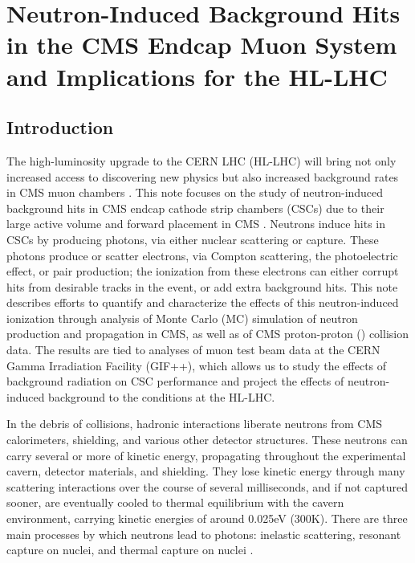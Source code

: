 \chapter{Neutron-Induced Background Hits in the CMS Endcap Muon System and Implications for the HL-LHC}
\section{Introduction}
\label{sec:intro}
The high-luminosity upgrade to the CERN LHC (HL-LHC) will bring not only increased access to discovering new physics but also increased background rates in CMS muon chambers \cite{Evans:2008zzb,Apollinari:2116337}. This note focuses on the study of neutron-induced background hits in CMS endcap cathode strip chambers (CSCs) due to their large active volume and forward placement in CMS \cite{CMS:1997dma,Chatrchyan:2009hb}. Neutrons induce hits in CSCs by producing photons, via either nuclear scattering or capture. These photons produce or scatter electrons, via Compton scattering, the photoelectric effect, or pair production; the ionization from these electrons can either corrupt hits from desirable tracks in the event, or add extra background hits. This note describes efforts to quantify and characterize the effects of this neutron-induced ionization through analysis of Monte Carlo (MC) simulation of neutron production and propagation in CMS, as well as of CMS proton-proton (\pp) collision data. The results are tied to analyses of muon test beam data at the CERN Gamma Irradiation Facility (GIF++), which allows us to study the effects of background radiation on CSC performance and project the effects of neutron-induced background to the conditions at the HL-LHC.

In the debris of \pp collisions, hadronic interactions liberate neutrons from CMS calorimeters, shielding, and various other detector structures. These neutrons can carry several \GeVns or more of kinetic energy, propagating throughout the experimental cavern, detector materials, and shielding. They lose kinetic energy through many scattering interactions over the course of several milliseconds, and if not captured sooner, are eventually cooled to thermal equilibrium with the cavern environment, carrying kinetic energies of around 0.025\unit{eV} (300\unit{K}). There are three main processes by which neutrons lead to photons: inelastic scattering, resonant capture on nuclei, and thermal capture on nuclei \cite{Kopecky:1997}.

